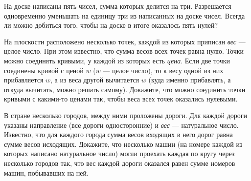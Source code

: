 ﻿
\begin{enumerate}
\itA На доске написаны пять чисел, сумма которых делится на три. Разрешается одновременно уменьшать на единицу три из написанных на доске чисел. Всегда ли можно добиться того, чтобы на доске в итоге оказалось пять нулей?

\itB На плоскости расположено несколько точек, каждой из которых приписан {\it вес} — целое число. При этом известно, что сумма весов всех точек равна нулю. Точки можно соединять кривыми, у каждой из которых есть {\it цена}. Если две точки соединены кривой с ценой $w$ ($w$ — целое число), то к весу одной из них прибавляется $w$, а из веса другой вычитается $w$ (куда именно прибавлять, а откуда вычитать, можно решать самому). Докажите, что можно соединить точки кривыми с какими-то ценами так, чтобы веса всех точек оказались нулевыми.

\itC В стране несколько городов, между ними проложены дороги. Для каждой дороги указаны направление (все дороги односторонние) и {\it вес} — натуральное число. Известно, что для каждого города сумма весов входящих в него дорог равна сумме весов исходящих. Докажите, что несколько машин (на номере каждой из которых написано натуральное число) могли проехать каждая по кругу через несколько городов так, что вес каждой дороги оказался равен сумме номеров машин, побывавших на ней.
\end{enumerate}